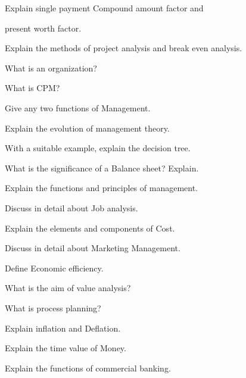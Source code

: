 \item Explain single payment
\iitem Compound amount factor and
\item present worth factor. 
\ene
\Or
\item Explain the methods of project analysis and break even analysis. 

\ene

\newpage \again

\sectionPM

\partA

\iitem What is an organization? 
\item What is CPM? \marka
\item Give any two functions of Management. 

\partBt

\item Explain the evolution of management theory. 
\item With a suitable example, explain the decision tree.  
\item What is the significance of a Balance sheet? Explain. 

\partCo

\item Explain the functions and principles of management.  
\Or
\item Discuss in detail about Job analysis.  

\item Explain the elements and components of Cost. 
\Or
\item Discuss in detail about Marketing Management. 

\ene

\newpage

\sub{\subj}
\maxtime

\separate
\sectionEE
\partA

\iitem Define Economic efficiency. 
\item What is the aim of value analysis? \marka
\item What is process planning? 

\partBt

\item Explain inflation and Deflation. 
\item Explain the time value of Money. 
\item Explain the functions of commercial banking. 

